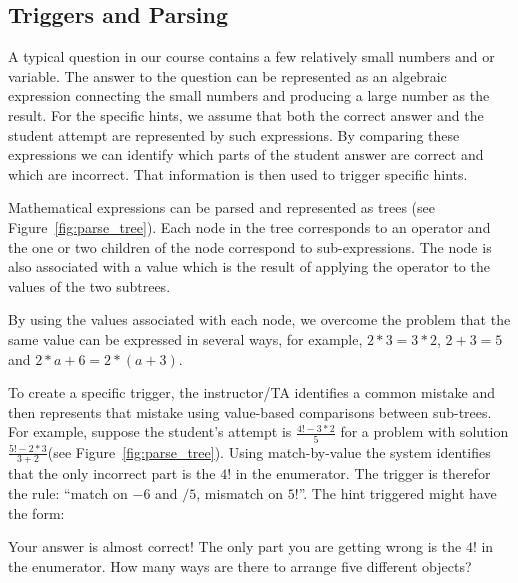 \documentclass{llncs2e/llncs}
\begin{document}
\subsection*{Triggers and Parsing}

A typical question in our course contains a few relatively small numbers and or variable. The answer to the question can be represented as an algebraic expression connecting the small numbers and producing a large number as the result. For the specific hints, we assume that both the correct answer and the student attempt are represented by such expressions. By comparing these expressions we can identify which parts of the student answer are correct and which are incorrect. That information is then used to trigger specific hints.

Mathematical expressions can be parsed and represented as trees (see Figure~\ref{fig:parse_tree}). Each node in the tree corresponds to an operator and the one or two children of the node correspond to sub-expressions. The node is also associated with a value which is the result of applying the operator to the values of the two subtrees.

By using the values associated with each node, we overcome the problem that the same value can be expressed in several ways, for example, $2*3 = 3*2$, $2+3=5$ and $2*a+6 = 2*(a+3)$. 

To create a specific trigger, the instructor/TA identifies a common mistake and then represents that mistake using value-based comparisons between sub-trees. For example, suppose the student's attempt is $\frac{4!-3*2}{5}$ for a problem with solution $\frac{5!-2*3}{3+2}$(see Figure~\ref{fig:parse_tree}). Using match-by-value the system identifies that the only incorrect part is the $4!$ in the enumerator. The trigger is therefor the rule: ``match on $-6$ and $/5$, mismatch on $5!$''. The hint triggered might have the form:
\begin{displayquote}
Your answer is almost correct! The only part you are getting wrong is
the $4!$ in the enumerator. How many ways are there to arrange five different objects?
\end{displayquote}
\end{document}
